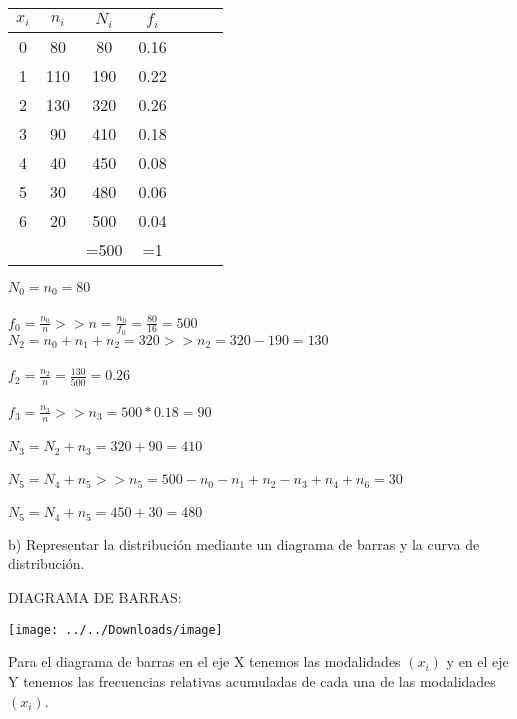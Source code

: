 \begin{table}[t]
\begin{center}
\begin{tabular}{ | c | c | c | c | c | c | c | }
	
	\hline	
	$x_{i}$ & $n_{i}$ & $N_{i}$ & $f_{i}$ \\ \hline
	0 & 80 & 80  & 0.16 \\
	1 & 110 & 190  & 0.22  \\
	2 & 130 & 320 & 0.26 \\
	3 & 90 & 410  & 0.18 \\ 
	4 & 40 & 450  & 0.08  \\
	5 & 30 & 480 & 0.06 \\
	6 & 20 & 500 & 0.04 \\\hline
	 &  & =500 & =1 \\\hline
	 
\end{tabular}
	\end{center}
		$ N_{0} = n_{0} = 80 $\\ \\
		$ f_{0} = \frac{n_{0}}{n}  >> n = \frac{n_{0}}{f_{0}} =  \frac{80}{16} = 500 $\\ 
		$ N_{2} = n_{0} + n_{1} + n_{2} = 320  >> n_{2} = 320 - 190 = 130 $ \\ \\
		$ f_{2} = \frac{n_{2}}{n} = \frac{130}{500} = 0.26$\\ \\
		$ f_{3} = \frac{n_{3}}{n} >> n_{3} = 500 * 0.18 = 90 $\\ \\
		$ N_{3} =N_{2} + n_{3} = 320 + 90 = 410  $\\ \\
		$ N_{5} =N_{4} + n_{5}  >>  n_{5}= 500 - n_{0} - n_{1} + n_{2} -n_{3} + n_{4} + n_{6} = 30 $ \\ \\
		$ N_{5} =N_{4} + n_{5} = 450 + 30 = 480 $\\ 
		
		

\end{table}	
	
b) Representar la distribución mediante un diagrama de barras y la curva de distribución.

\begin{center}
DIAGRAMA DE BARRAS:
\begin{center}
\begin{center}
	\texttt{[image: ../../Downloads/image]}
\end{center}
\end{center}
Para el diagrama de barras en el eje X tenemos las modalidades $(x_{i})$ y en el eje Y tenemos las frecuencias relativas acumuladas de cada una de las modalidades $(x_{i})$. \\

\end{center}

